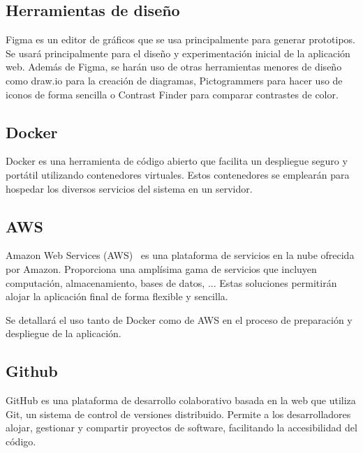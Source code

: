 \subsection{Herramientas de diseño}

Figma \cite{figma} es un editor de gráficos que se usa principalmente para generar prototipos. Se usará principalmente para
el diseño y experimentación inicial de la aplicación web. Además de Figma, se harán uso de otras herramientas
menores de diseño como draw.io \cite{draw.io} para la creación de diagramas, Pictogrammers \cite{pictogrammers} para hacer uso de
iconos de forma sencilla o Contrast Finder \cite{contrastFinder} para comparar contrastes de color.

\subsection{Docker}

Docker \cite{docker} es una herramienta de código abierto que facilita un despliegue seguro y portátil utilizando contenedores
virtuales. Estos contenedores se emplearán para hospedar los diversos servicios del sistema en un
servidor.

\subsection{AWS}

Amazon Web Services (AWS)~\cite{aws} es una plataforma de servicios en la nube ofrecida por Amazon. Proporciona
una amplísima gama de servicios que incluyen computación, almacenamiento, bases de datos, ... Estas soluciones permitirán
alojar la aplicación final de forma flexible y sencilla.

Se detallará el uso tanto de Docker como de AWS en el proceso de preparación y despliegue de la aplicación.

\subsection{Github}

GitHub \cite{github} es una plataforma de desarrollo colaborativo basada en la web que utiliza Git, un sistema de control de versiones
distribuido. Permite a los desarrolladores alojar, gestionar y compartir proyectos de software, facilitando la accesibilidad
del código.

